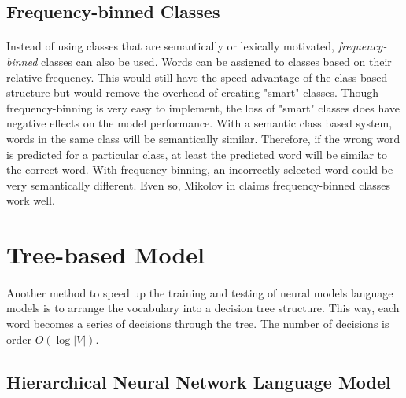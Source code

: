 \subsection{Frequency-binned Classes} \label{sec:frequencybinning}
\paragraph{}
Instead of using classes that are semantically or lexically motivated, \emph{frequency-binned} classes can also be used. Words can be assigned to classes based on their relative frequency. This would still have the speed advantage of the class-based structure but would remove the overhead of creating "smart" classes. Though frequency-binning is very easy to implement, the loss of "smart" classes does have negative effects on the model performance. With a semantic class based system, words in the same class will be semantically similar. Therefore, if the wrong word is predicted for a particular class, at least the predicted word will be similar to the correct word. With frequency-binning, an incorrectly selected word could be very semantically different. Even so, Mikolov in \cite{Mikolov2012} claims frequency-binned classes work well. 

\section{Tree-based Model}
\paragraph{}
Another method to speed up the training and testing of neural models language models is to arrange the vocabulary into a decision tree structure. This way, each word becomes a series of decisions through the tree. The number of decisions is order $O(\log|V|)$.

\subsection{Hierarchical Neural Network Language Model}
